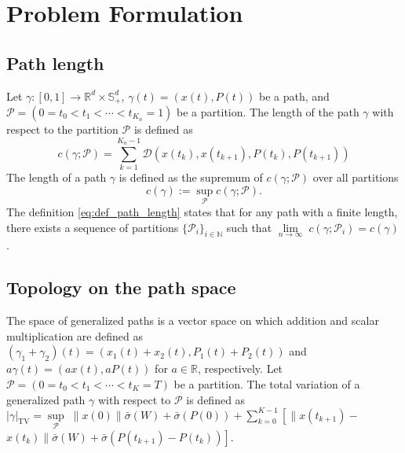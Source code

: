 \documentclass[Afour,sageh,times]{sagej}
\begin{document}
\section{Problem Formulation}
\label{sec:problem_formulation}
\subsection{Path length}
Let $\gamma: [0,1]\rightarrow \mathbb{R}^d\times \mathbb{S}_{+}^d$, $\gamma(t)=(x(t), P(t))$ be a path, and $\mathcal{P}=(0=t_0<t_1<\cdots < t_{K_n}=1)$ be a partition.
The length of the path $\gamma$ with respect to the partition $\mathcal{P}$ is defined as
\begin{equation}
c(\gamma;\mathcal{P})=\sum_{k=1}^{K_n-1} \mathcal{D}(x(t_k), x(t_{k+1}), P(t_k), P(t_{k+1}))
\end{equation}
The length of a path $\gamma$ is defined as the supremum of $c(\gamma;\mathcal{P})$ over all partitions
\begin{equation}
\label{eq:def_path_length}
c(\gamma):=\sup_\mathcal{P} c(\gamma;\mathcal{P}).
\end{equation}
The definition \eqref{eq:def_path_length} states that for any path with a finite length, there exists a sequence of partitions
$\{\mathcal{P}_i\}_{i\in\mathbb{N}}$ such that
$\underset{n\rightarrow\infty}{\lim}\; c(\gamma; \mathcal{P}_i) =c(\gamma)$.

\subsection{Topology on the path space}
The space of generalized paths is a vector space on which addition and scalar multiplication are defined as $\left(\gamma_1+\gamma_2\right)(t)=\left(x_1(t)+x_2(t), P_1(t)+P_2(t)\right)$ and $a \gamma(t)=(a x(t), a P(t))$ for $a \in \mathbb{R}$, respectively. Let $\mathcal{P}=\left(0=t_0<t_1<\cdots<t_K=T\right)$ be a partition. The total variation of a generalized path $\gamma$ with respect to $\mathcal{P}$ is defined as $|\gamma|_{\mathrm{TV}}=\underset{{\mathcal{P}}}{\sup}\; \|x(0)\| \bar{\sigma}(W)+\bar{\sigma}(P(0))+\sum_{k=0}^{K-1}\left[\| x\left(t_{k+1}\right)-\right.$ $\left.x\left(t_k\right) \| \bar{\sigma}(W)+\bar{\sigma}\left(P\left(t_{k+1}\right)-P\left(t_k\right)\right)\right]$. 
\end{document}
